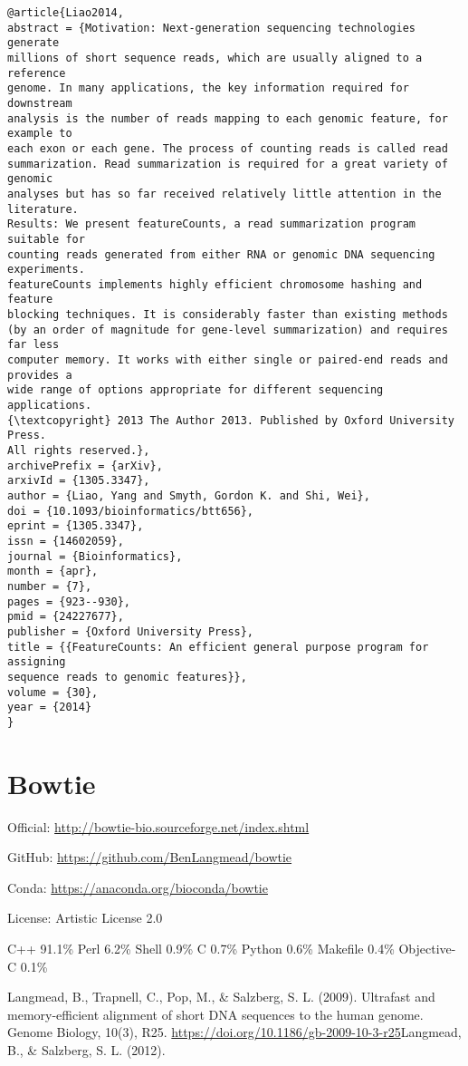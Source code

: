 \documentclass[]{article}
\begin{document}
\begin{verbatim}
@article{Liao2014,
abstract = {Motivation: Next-generation sequencing technologies generate
millions of short sequence reads, which are usually aligned to a reference
genome. In many applications, the key information required for downstream
analysis is the number of reads mapping to each genomic feature, for example to
each exon or each gene. The process of counting reads is called read
summarization. Read summarization is required for a great variety of genomic
analyses but has so far received relatively little attention in the literature.
Results: We present featureCounts, a read summarization program suitable for
counting reads generated from either RNA or genomic DNA sequencing experiments.
featureCounts implements highly efficient chromosome hashing and feature
blocking techniques. It is considerably faster than existing methods
(by an order of magnitude for gene-level summarization) and requires far less
computer memory. It works with either single or paired-end reads and provides a
wide range of options appropriate for different sequencing applications.
{\textcopyright} 2013 The Author 2013. Published by Oxford University Press.
All rights reserved.},
archivePrefix = {arXiv},
arxivId = {1305.3347},
author = {Liao, Yang and Smyth, Gordon K. and Shi, Wei},
doi = {10.1093/bioinformatics/btt656},
eprint = {1305.3347},
issn = {14602059},
journal = {Bioinformatics},
month = {apr},
number = {7},
pages = {923--930},
pmid = {24227677},
publisher = {Oxford University Press},
title = {{FeatureCounts: An efficient general purpose program for assigning
sequence reads to genomic features}},
volume = {30},
year = {2014}
}
\end{verbatim}

\section{Bowtie}

Official: \url{http://bowtie-bio.sourceforge.net/index.shtml}

GitHub: \url{https://github.com/BenLangmead/bowtie}

Conda: \url{https://anaconda.org/bioconda/bowtie}

License: Artistic License 2.0

C++ 91.1\% Perl 6.2\% Shell 0.9\% C 0.7\% Python 0.6\% Makefile 0.4\% Objective-C 0.1\%



Langmead, B., Trapnell, C., Pop, M., \& Salzberg, S. L. (2009). Ultrafast and memory-efficient alignment of short DNA sequences to the human genome. Genome Biology, 10(3), R25. \url{https://doi.org/10.1186/gb-2009-10-3-r25}Langmead, B., \& Salzberg, S. L. (2012).
\end{document}
